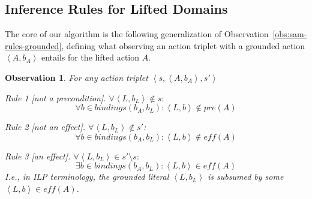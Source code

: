 \documentclass{article}
\newtheorem{observation}{Observation}
\newcommand{\tuple}[1]{\ensuremath{\left \langle #1 \right \rangle }}
\newcommand{\pre}{\textit{pre}}
\newcommand{\eff}{\textit{eff}}
\newcommand{\liftl}{L}
\newcommand{\lifta}{A}
\newcommand{\bindings}{\textit{bindings}}
\begin{document}








\subsection{Inference Rules for Lifted Domains}
The core of our algorithm is the following generalization of Observation~\ref{obs:sam-rules-grounded}, 
defining what observing an action triplet with a grounded action $\tuple{\lifta, b_\lifta}$ entails for the lifted action $\lifta$.
\begin{observation}\label{obs:sam-rules-lifted-general}
For any action triplet $\tuple{s, \tuple{\lifta, b_\lifta}, s'}$%
\begin{compactitem}
    \item Rule 1 [not a precondition].  
    $\forall \tuple{\liftl, b_\liftl} \notin s:$
    \begin{equation}
     \forall b\in \bindings(b_\lifta, b_\liftl): 
     \tuple{\liftl,b} \notin \pre(\lifta)
    \end{equation}
    \item Rule 2 [not an effect].  
    $\forall \tuple{\liftl, b_\liftl} \notin s'$:
    \begin{equation}
     \forall b\in \bindings(b_\lifta, b_\liftl): 
     \tuple{\liftl,b} \notin \eff(\lifta)
    \end{equation}
    \item Rule 3 [an effect]. 
    $\forall \tuple{\liftl,b_\liftl} \in s'\setminus s:$
    \begin{equation}
    \exists b\in\bindings(b_\lifta, b_\liftl): 
    \tuple{\liftl,b} \in \eff(\lifta)
    \end{equation}
    I.e., in ILP terminology, the grounded literal $\tuple{\liftl,b_\liftl}$ is \emph{subsumed} by some $\tuple{\liftl,b} \in \eff(\lifta)$.
\end{compactitem}
\end{observation}
\end{document}
